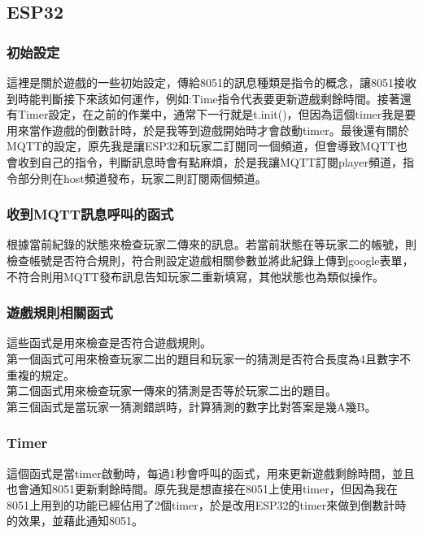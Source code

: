 \documentclass{scrartcl}
\begin{document}
\subsection{ESP32}

\subsubsection{初始設定}

這裡是關於遊戲的一些初始設定，傳給8051的訊息種類是指令的概念，讓8051接收到時能判斷接下來該如何運作，例如:Time指令代表要更新遊戲剩餘時間。接著還有Timer設定，在之前的作業中，通常下一行就是t.init()，但因為這個timer我是要用來當作遊戲的倒數計時，於是我等到遊戲開始時才會啟動timer。最後還有關於MQTT的設定，原先我是讓ESP32和玩家二訂閱同一個頻道，但會導致MQTT也會收到自己的指令，判斷訊息時會有點麻煩，於是我讓MQTT訂閱player頻道，指令部分則在host頻道發布，玩家二則訂閱兩個頻道。

\subsubsection{收到MQTT訊息呼叫的函式}

根據當前紀錄的狀態來檢查玩家二傳來的訊息。若當前狀態在等玩家二的帳號，則檢查帳號是否符合規則，符合則設定遊戲相關參數並將此紀錄上傳到google表單，不符合則用MQTT發布訊息告知玩家二重新填寫，其他狀態也為類似操作。

\subsubsection{遊戲規則相關函式}

這些函式是用來檢查是否符合遊戲規則。\\
第一個函式可用來檢查玩家二出的題目和玩家一的猜測是否符合長度為4且數字不重複的規定。\\
第二個函式用來檢查玩家一傳來的猜測是否等於玩家二出的題目。\\
第三個函式是當玩家一猜測錯誤時，計算猜測的數字比對答案是幾A幾B。

\subsubsection{Timer}

這個函式是當timer啟動時，每過1秒會呼叫的函式，用來更新遊戲剩餘時間，並且也會通知8051更新剩餘時間。原先我是想直接在8051上使用timer，但因為我在8051上用到的功能已經佔用了2個timer，於是改用ESP32的timer來做到倒數計時的效果，並藉此通知8051。
\end{document}
